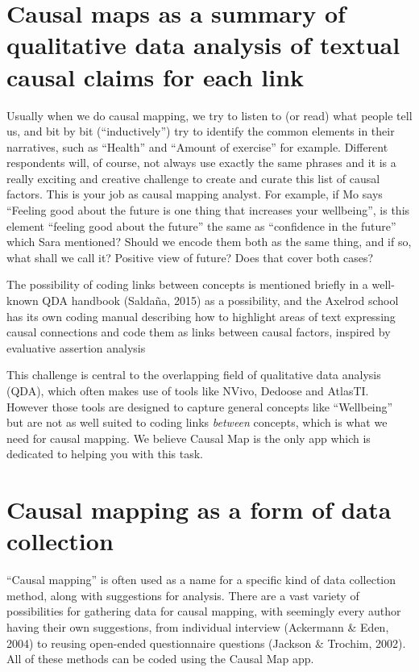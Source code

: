 \documentclass[
]{book}
\begin{document}
\hypertarget{causal-maps-as-a-summary-of-qualitative-data-analysis-of-textual-causal-claims-for-each-link}{%
\section{Causal maps as a summary of qualitative data analysis of textual causal claims for each link}\label{causal-maps-as-a-summary-of-qualitative-data-analysis-of-textual-causal-claims-for-each-link}}

Usually when we do causal mapping, we try to listen to (or read) what people tell us, and bit by bit (``inductively'') try to identify the common elements in their narratives, such as ``Health'' and ``Amount of exercise'' for example. Different respondents will, of course, not always use exactly the same phrases and it is a really exciting and creative challenge to create and curate this list of causal factors. This is your job as causal mapping analyst. For example, if Mo says ``Feeling good about the future is one thing that increases your wellbeing'', is this element ``feeling good about the future'' the same as ``confidence in the future'' which Sara mentioned? Should we encode them both as the same thing, and if so, what shall we call it? Positive view of future? Does that cover both cases?

The possibility of coding links between concepts is mentioned briefly in a well-known QDA handbook (Saldaña, 2015) as a possibility, and the Axelrod school has its own coding manual describing how to highlight areas of text expressing causal connections and code them as links between causal factors, inspired by evaluative assertion analysis

This challenge is central to the overlapping field of qualitative data analysis (QDA), which often makes use of tools like NVivo, Dedoose and AtlasTI. However those tools are designed to capture general concepts like ``Wellbeing'' but are not as well suited to coding links \emph{between} concepts, which is what we need for causal mapping. We believe Causal Map is the only app which is dedicated to helping you with this task.

\hypertarget{causal-mapping-as-a-form-of-data-collection}{%
\section{Causal mapping as a form of data collection}\label{causal-mapping-as-a-form-of-data-collection}}

``Causal mapping'' is often used as a name for a specific kind of data collection method, along with suggestions for analysis. There are a vast variety of possibilities for gathering data for causal mapping, with seemingly every author having their own suggestions, from individual interview (Ackermann \& Eden, 2004) to reusing open-ended questionnaire questions (Jackson \& Trochim, 2002). All of these methods can be coded using the Causal Map app.
\end{document}
